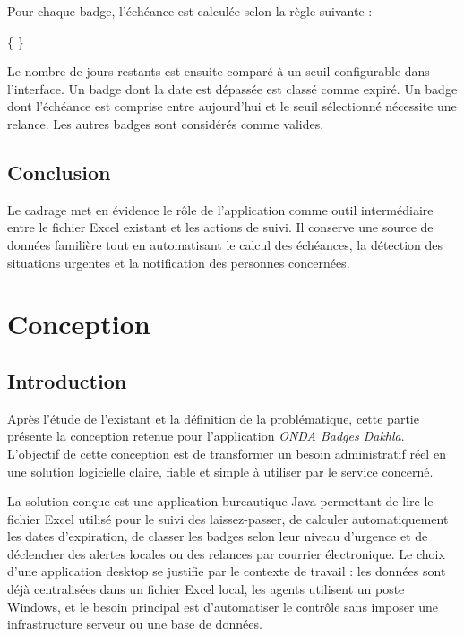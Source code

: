 \documentclass[12pt,a4paper,openany]{report}
\newcommand{\figurePlaceholder}[2]{%
  \begin{figure}[H]
    \centering
    \fbox{%
      \begin{minipage}[c][4.2cm][c]{0.82\textwidth}
        \centering
        \color{ondaGray}
        \small
        \textit{Emplacement réservé pour une capture d'écran ou un schéma.}\\[0.4em]
        #1
      \end{minipage}%
    }
    \caption{#2}
  \end{figure}
}
\begin{document}
Pour chaque badge, l'échéance est calculée selon la règle suivante :

\{
\}

Le nombre de jours restants est ensuite comparé à un seuil configurable dans
l'interface. Un badge dont la date est dépassée est classé comme expiré. Un
badge dont l'échéance est comprise entre aujourd'hui et le seuil sélectionné
nécessite une relance. Les autres badges sont considérés comme valides.



\section{Conclusion}

Le cadrage met en évidence le rôle de l'application comme outil intermédiaire
entre le fichier Excel existant et les actions de suivi. Il conserve une source
de données familière tout en automatisant le calcul des échéances, la détection
des situations urgentes et la notification des personnes concernées.

\chapter{Conception}

\section{Introduction}

Après l'étude de l'existant et la définition de la problématique, cette partie
présente la conception retenue pour l'application \textit{ONDA Badges Dakhla}.
L'objectif de cette conception est de transformer un besoin administratif réel
en une solution logicielle claire, fiable et simple à utiliser par le service
concerné.

La solution conçue est une application bureautique Java permettant de lire le
fichier Excel utilisé pour le suivi des laissez-passer, de calculer
automatiquement les dates d'expiration, de classer les badges selon leur niveau
d'urgence et de déclencher des alertes locales ou des relances par courrier
électronique. Le choix d'une application desktop se justifie par le contexte de
travail : les données sont déjà centralisées dans un fichier Excel local, les
agents utilisent un poste Windows, et le besoin principal est d'automatiser le
contrôle sans imposer une infrastructure serveur ou une base de données.
\end{document}
